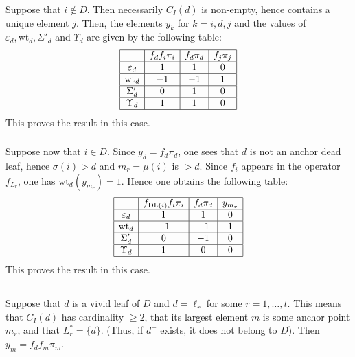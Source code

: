 \documentclass[12pt]{amsart}
\numberwithin{equation}{section}
\theoremstyle{definition}
\def\DL{\mathrm{DL}}  %
\def\wt{\mathrm{wt}}  %
\let\vep\varepsilon
\begin{document}
\subsubsection{}\label{sub-dead-isol}  Suppose that $i\not\in D$. Then necessarily $C_I(d)$ is non-empty, hence contains a unique element 
$j$. Then, the elements $y_k$ for $k = i,d,j$ and the values of $\vep_d,\wt_d, \Sigma'_d$ and $\Upsilon_d$ 
are given by the following table: 
$$
\begin{array}{|c|c|c|c|c|c|c|c|c|c|}
\hline 
 & f_d f_i  \pi_i  &  f_d \pi_d &   f_j \pi_j 
\\
\hline 
\vep_d & 1 &  1 &  0
\\
\hline 
\wt_d & -1 & -1 & 1
\\
\hline 
\Sigma'_d & 0 & 1 & 0 
\\
\hline 
\Upsilon_d &  1  & 1  & 0
\\
\hline
\end{array}
$$
This proves the result in this case. 

\subsubsection{}\label{sub-dead-not_isol} 
Suppose now that $i\in D$. Since $y_d = f_d \pi_d$, one sees that $d$ is not an anchor dead leaf, hence 
$\sigma(i) > d$ and $m_r = \mu(i)$ is $> d$. Since $f_i$ appears in the operator $f_{L_r}$, one has 
$\wt_d(y_{m_r}) = 1$. 
Hence one obtains the following table: 
$$
\begin{array}{|c|c|c|c|}
\hline 
 & f_{\DL(i)} f_i\pi_i &  f_d \pi_d & y_{m_r} 
\\
\hline 
\vep_d & 1 & 1 & 0 
\\
\hline 
\wt_d & -1 & -1 & 1 
\\
\hline 
\Sigma'_d & 0 &  -1 & 0 
\\
\hline 
\Upsilon_d & 1  & 0 & 0
\\
\hline
\end{array}
$$
This proves the result in this case. 

\subsection{} Suppose that $d$ is a vivid leaf of $D$ and $d = \ell _r$ for some $r = 1,\dots, t$. 
This means that $C_I(d)$ has cardinality $\geq 2$, that its largest element $m$ is 
some anchor point $m_r$, and that $L_r^* = \{d\}$. (Thus, if $d^-$ exists, it does not belong to 
$D$). Then $y_m = f_d f_m \pi_m$. 
\end{document}
